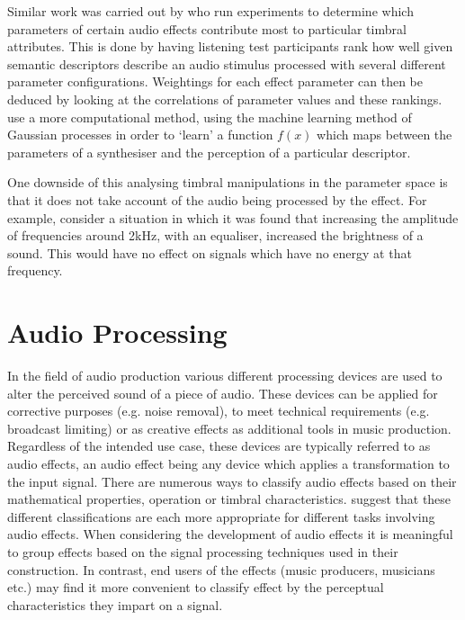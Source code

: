 		Similar work was carried out by \citet{sabin2011weighting} who run experiments to determine which
		parameters of certain audio effects contribute most to particular timbral attributes. This is done by
		having listening test participants rank how well given semantic descriptors describe an audio stimulus
		processed with several different parameter configurations. Weightings for each effect parameter can then be
		deduced by looking at the correlations of parameter values and these rankings. \citet{huang2014active} use
		a more computational method, using the machine learning method of Gaussian processes in order to `learn' a
		function $f(x)$ which maps between the parameters of a synthesiser and the perception of a particular
		descriptor.

		One downside of this analysing timbral manipulations in the parameter space is that it does not take
		account of the audio being processed by the effect. For example, consider a situation in which it was found
		that increasing the amplitude of frequencies around 2kHz, with an equaliser, increased the brightness of a
		sound. This would have no effect on signals which have no energy at that frequency.

\section{Audio Processing}
\label{sec:Timbre-AudioProcessing}
	In the field of audio production various different processing devices are used to alter the perceived sound of a
	piece of audio. These devices can be applied for corrective purposes (e.g. noise removal), to meet technical
	requirements (e.g. broadcast limiting) or as creative effects as additional tools in music production. Regardless
	of the intended use case, these devices are typically referred to as audio effects, an audio effect being any
	device which applies a transformation to the input signal. There are numerous ways to classify audio effects based
	on their mathematical properties, operation or timbral characteristics. \citet{verfaille2006an} suggest that these
	different classifications are each more appropriate for different tasks involving audio effects. When considering
	the development of audio effects it is meaningful to group effects based on the signal processing techniques used
	in their construction. In contrast, end users of the effects (music producers, musicians etc.) may find it more
	convenient to classify effect by the perceptual characteristics they impart on a signal.

